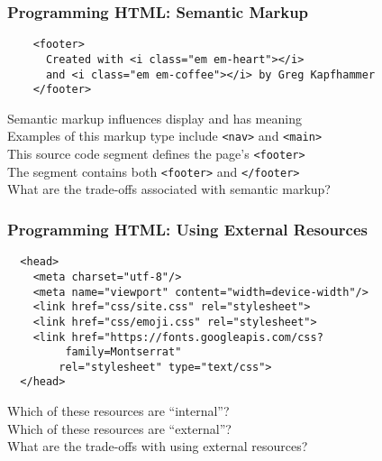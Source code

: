 \documentclass[14pt,aspectratio=169]{beamer}
\begin{document}
%
\begin{frame}[fragile]
  \frametitle{Programming HTML: Semantic Markup}
  \normalsize
  \hspace*{-.45in}
  \begin{minipage}{6in}
    \vspace*{-.15in}
    \begin{verbatim}
    <footer>
      Created with <i class="em em-heart"></i>
      and <i class="em em-coffee"></i> by Greg Kapfhammer
    </footer>
    \end{verbatim}
  \end{minipage}
  \vspace*{.05in}
  \begin{center}
    \normalsize \noindent Semantic markup influences display and has meaning \\
    \normalsize \noindent Examples of this markup type include {\tt <nav>} and {\tt <main>} \\
    \normalsize \noindent This source code segment defines the page's {\tt <footer>} \\
    \normalsize \noindent The segment contains both {\tt <footer>} and {\tt </footer>} \\
    \normalsize \noindent What are the trade-offs associated with semantic markup? \\
  \end{center}
\end{frame}

%
\begin{frame}[fragile]
  \frametitle{Programming HTML: Using External Resources}
  \normalsize
  \hspace*{-.15in}
  \begin{minipage}{6in}
    \vspace*{.15in}
    \begin{verbatim}
  <head>
    <meta charset="utf-8"/>
    <meta name="viewport" content="width=device-width"/>
    <link href="css/site.css" rel="stylesheet">
    <link href="css/emoji.css" rel="stylesheet">
    <link href="https://fonts.googleapis.com/css?
         family=Montserrat"
        rel="stylesheet" type="text/css">
  </head>
    \end{verbatim}
  \end{minipage}
  \vspace*{-.05in}
  \begin{center}
    \normalsize \noindent Which of these resources are ``internal''? \\
    \normalsize \noindent Which of these resources are ``external''? \\
    \normalsize \noindent What are the trade-offs with using external resources? \\
  \end{center}
\end{frame}
\end{document}
